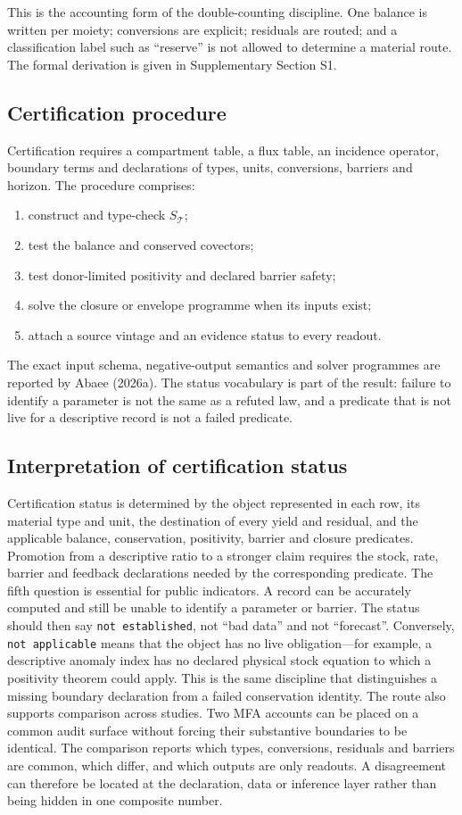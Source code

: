 \documentclass[11pt]{article}
\begin{document}
This is the accounting form of the double-counting discipline. One balance is written per moiety; conversions are explicit; residuals are routed; and a classification label such as ``reserve'' is not allowed to determine a material route. The formal derivation is given in Supplementary Section S1.
\subsection{Certification procedure}
Certification requires a compartment table, a flux table, an incidence operator, boundary terms and declarations of types, units, conversions, barriers and horizon. The procedure comprises:
\begin{enumerate}
\item construct and type-check \(S_{\mathcal T}\);
\item test the balance and conserved covectors;
\item test donor-limited positivity and declared barrier safety;
\item solve the closure or envelope programme when its inputs exist;
\item attach a source vintage and an evidence status to every readout.
\end{enumerate}
The exact input schema, negative-output semantics and solver programmes are reported by Abaee (2026a). The status vocabulary is part of the result: failure to identify a parameter is not the same as a refuted law, and a predicate that is not live for a descriptive record is not a failed predicate.
\subsection{Interpretation of certification status}
Certification status is determined by the object represented in each row, its material type and unit, the destination of every yield and residual, and the applicable balance, conservation, positivity, barrier and closure predicates. Promotion from a descriptive ratio to a stronger claim requires the stock, rate, barrier and feedback declarations needed by the corresponding predicate.
The fifth question is essential for public indicators. A record can be accurately computed and still be unable to identify a parameter or barrier. The status should then say \texttt{not established}, not ``bad data'' and not ``forecast''. Conversely, \texttt{not applicable} means that the object has no live obligation---for example, a descriptive anomaly index has no declared physical stock equation to which a positivity theorem could apply. This is the same discipline that distinguishes a missing boundary declaration from a failed conservation identity.
The route also supports comparison across studies. Two MFA accounts can be placed on a common audit surface without forcing their substantive boundaries to be identical. The comparison reports which types, conversions, residuals and barriers are common, which differ, and which outputs are only readouts. A disagreement can therefore be located at the declaration, data or inference layer rather than being hidden in one composite number.
\end{document}
